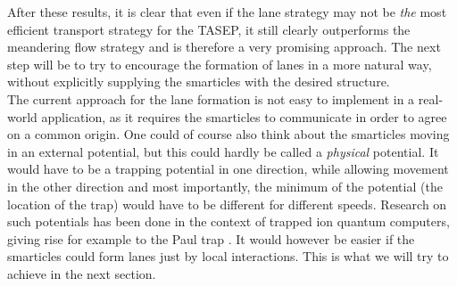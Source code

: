 After these results, it is clear that even if the lane strategy may not be \textit{the} most efficient transport strategy for the TASEP, it still clearly outperforms the meandering flow strategy and is therefore a very promising approach. The next step will be to try to encourage the formation of lanes in a more natural way, without explicitly supplying the smarticles with the desired structure.
\\
The current approach for the lane formation is not easy to implement in a real-world application, as it requires the smarticles to communicate in order to agree on a common origin. One could of course also think about the smarticles moving in an external potential, but this could hardly be called a \textit{physical} potential. It would have to be a trapping potential in one direction, while allowing movement in the other direction and most importantly, the minimum of the potential (the location of the trap) would have to be different for different speeds. Research on such potentials has been done in the context of trapped ion quantum computers, giving rise for example to the Paul trap \cite[II.A]{bruzewicz_trapped-ion_2019}. It would however be easier if the smarticles could form lanes just by local interactions. This is what we will try to achieve in the next section.

